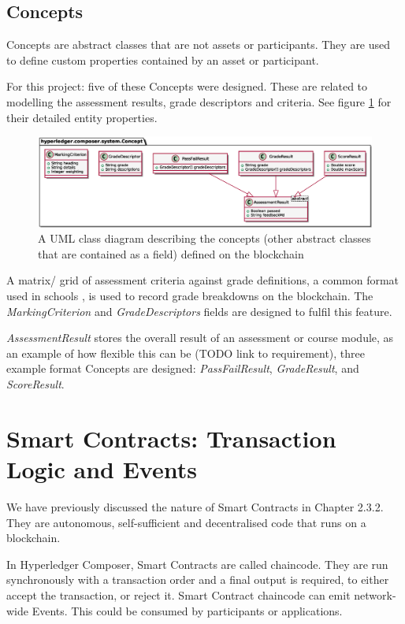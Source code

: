 \subsection{Concepts}

Concepts are abstract classes that are not assets or participants. They are used to define custom properties contained by an asset or participant.

For this project: five of these Concepts were designed. These are related to modelling the assessment results, grade descriptors and criteria. 
See figure \ref{fig:concepts} for their detailed entity properties.

\begin{figure}[!ht] 
    \centering    
    \includegraphics[width=1.0\textwidth]{concepts}
    \caption[Concepts Class Diagram]
        {A UML class diagram describing the concepts (other abstract classes that are contained as a field) defined on the blockchain} 
    \label{fig:concepts}
\end{figure}

A matrix/ grid of assessment criteria against grade definitions, a common format used in schools \citep[p.102]{bryan2006innovative}, 
is used to record grade breakdowns on the blockchain. The \textit{MarkingCriterion} and \textit{GradeDescriptors} fields are designed to 
fulfil this feature.

\textit{AssessmentResult} stores the overall result of an assessment or course module, as an example of how flexible this can be (TODO link to requirement), 
three example format Concepts are designed: \textit{PassFailResult}, \textit{GradeResult}, and \textit{ScoreResult}.

\section{Smart Contracts: Transaction Logic and Events}

We have previously discussed the nature of Smart Contracts in Chapter 2.3.2. They are autonomous, self-sufficient and 
decentralised code that runs on a blockchain. 

In Hyperledger Composer, Smart Contracts are called chaincode. 
They are run synchronously with a transaction order and a final output is required, to either accept the transaction, or reject it. 
Smart Contract chaincode can emit network-wide Events. This could be consumed by participants or applications.

